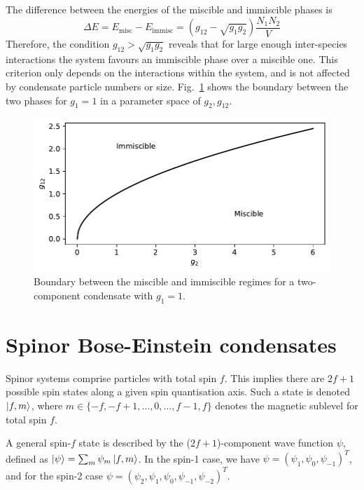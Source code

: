 The difference between the energies of the miscible and immiscible phases
is
\begin{equation}
    \Delta E = E_\mathrm{misc} - E_\mathrm{immisc} = (g_{12} - \sqrt{g_1g_2})
    \frac{N_1N_2}{V}
\end{equation}
Therefore, the condition \(g_{12} > \sqrt{g_1g_2}\) reveals that for large
enough inter-species interactions the system favours an immiscible phase
over a miscible one.
This criterion only depends on the interactions within the system, and is not
affected by condensate particle numbers or size.
Fig.~\ref{fig: miscible-vs-immiscible} shows the boundary between the two
phases for \(g_1=1\) in a parameter space of \(g_2, g_{12}\).
\begin{figure}
    \centering
    \includegraphics{gfx/ch-theory/miscible_vs_immiscible.pdf}
    \caption{\label{fig: miscible-vs-immiscible}Boundary between the miscible
    and immiscible regimes for a two-component condensate with \(g_1=1\).}
\end{figure}


\section{Spinor Bose-Einstein condensates}
Spinor systems comprise particles with total spin \(f\).
This implies there are \(2f + 1\) possible spin states along a given spin
quantisation axis.
Such a state is denoted \(\ket{f, m} \), where
\(m \in \{-f, -f+1, \ldots, 0, \ldots, f - 1, f\} \) denotes the magnetic
sublevel for total spin \( f\).

A general spin-\(f\) state is described by the (\(2f+1\))-component wave
function \(\psi \), defined as \(\ket{\psi} = \sum_m\psi_m\ket{f, m}\).
In the spin-1 case, we have \(\psi = {(\psi_1, \psi_0, \psi_{-1})}^T\), and for
the spin-2 case \(\psi = {(\psi_2, \psi_1, \psi_0, \psi_{-1}, \psi_{-2})}^T\).

